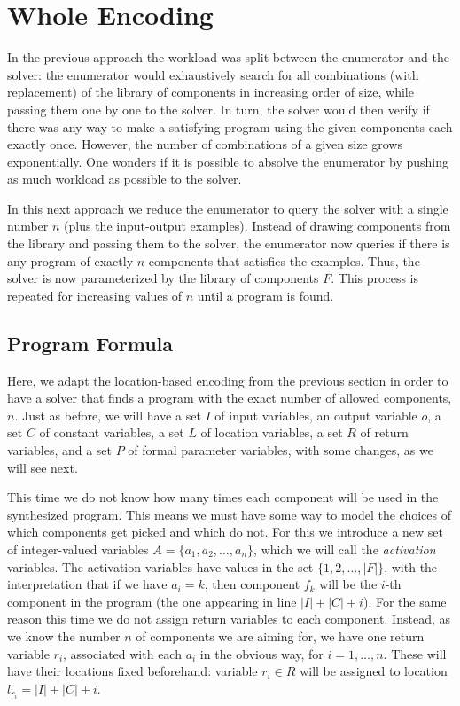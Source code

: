 \section{Whole Encoding}
\label{sec:whole-encoding}

In the previous approach the workload was split between the enumerator and the
solver: the enumerator would exhaustively search for all combinations (with
replacement) of the library of components in increasing order of size, while
passing them one by one to the solver. In turn, the solver would then verify if
there was any way to make a satisfying program using the given components each
exactly once. However, the number of combinations of a given size grows
exponentially. One wonders if it is possible to absolve the enumerator by
pushing as much workload as possible to the solver.

In this next approach we reduce the enumerator to query the solver with a single
number $n$ (plus the input-output examples). Instead of drawing components from the
library and passing them to the solver, the enumerator now queries if there is 
any program of exactly $n$ components that satisfies the examples. Thus, the
solver is now parameterized by the library of components $F$. This process is
repeated for increasing values of $n$ until a program is found.

\subsection{Program Formula}
\label{sec:program-formula-whole}

Here, we adapt the location-based encoding from the previous section in order to
have a solver that finds a program with the exact number of allowed components,
$n$. 
Just as before, we will have a set $I$ of input variables, an output variable
$o$, a set $C$ of constant variables, a set $L$ of location variables, a set $R$
of return variables, and a set $P$ of formal parameter variables, with some
changes, as we will see next.

This time we do not know how many times each component will be used in the
synthesized program.
This means we must have some way to model the choices of which components get
picked and which do not.
For this we introduce a new set of integer-valued variables $A = \{a_1, a_2,
\ldots, a_n\}$, which we will call the \textit{activation} variables.
The activation variables have values in the set $\{1, 2, \ldots, |F|\}$, with
the interpretation that if we have $a_i = k$, then component $f_k$ will be the
$i$-th component in the program (the one appearing in line $|I| + |C| + i$).
For the same reason this time we do not assign return variables to each
component.
Instead, as we know the number $n$ of components we are aiming for, we have one
return variable $r_i$, associated with each $a_i$ in the obvious way, for
$i = 1, \ldots, n$.
These will have their locations fixed beforehand: variable $r_i \in R$ will be
assigned to location $l_{r_i} = |I| + |C| + i$.


